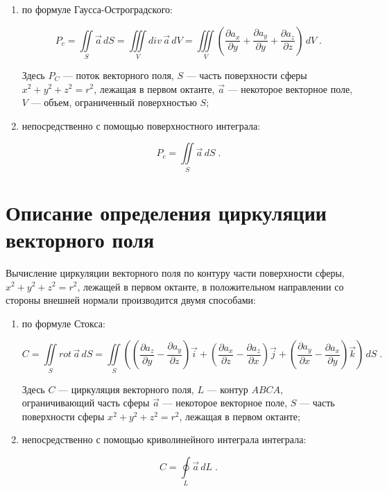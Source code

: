 \documentclass[14pt,a4paper,final]{extreport}
\begin{document}
\begin{enumerate}
	\item  по формуле Гаусса-Остроградского:
	
	\[ P_c = \iint\limits_S \vec a\, dS = \iiint\limits_V div\, \vec a \,dV = \iiint\limits_V
(\frac{\partial a_x}{\partial y} + \frac{\partial a_y}{\partial y} + \frac{\partial a_z}{\partial z} )\, dV \;. \]

\pagebreak %

	
	Здесь $P_C$ --- поток векторного поля, $S$ --- часть поверхности сферы $x^2+y^2+z^2=r^2$, лежащая в первом октанте, $\vec{a}$ --- некоторое векторное поле, $V$ --- объем, ограниченный поверхностью $S$;
	
	\item  непосредственно с помощью поверхностного интеграла:
	
	\[ P_c = \iint\limits_S \vec a\, dS \;. \]
	
\end{enumerate}


\section{Описание определения циркуляции векторного поля}

Вычисление циркуляции векторного поля по контуру части поверхности сферы, $x^2+y^2+z^2=r^2$, лежащей в первом октанте, в положительном направлении со стороны внешней нормали производится двумя способами:

\begin{enumerate}[label=\arabic*.,ref=\arabic*]
	\item  по формуле Стокса:
	
	\[ C = \iint\limits_S rot \,\vec a \,dS = \iint\limits_S
( (\frac{\partial a_z}{\partial y} - \frac{\partial a_y}{\partial z})\vec i + (\frac{\partial a_x}{\partial z} - \frac{\partial a_z}{\partial x})\vec j + (\frac{\partial a_y}{\partial x} - \frac{\partial a_x}{\partial y})\vec k) \,dS \;. \]



	Здесь $C$ --- циркуляция векторного поля, $L$ ---  контур $ABCA$, ограничивающий часть сферы $\vec{a}$ --- некоторое векторное поле, $S$ --- часть поверхности сферы $x^2+y^2+z^2=r^2$, лежащая в первом октанте;
	
	\item  непосредственно с помощью криволинейного интеграла интеграла:
	
	\[ C = \oint\limits_L \vec a \, dL \;. \]
	
\end{enumerate}
\end{document}
